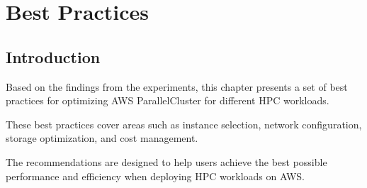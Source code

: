 

\chapter{Best Practices}

\section{Introduction}

Based on the findings from the experiments, this chapter presents a set of best practices for optimizing AWS ParallelCluster for different HPC workloads. 

These best practices cover areas such as instance selection, network configuration, storage optimization, and cost management. 

The recommendations are designed to help users achieve the best possible performance and efficiency when deploying HPC workloads on AWS.
